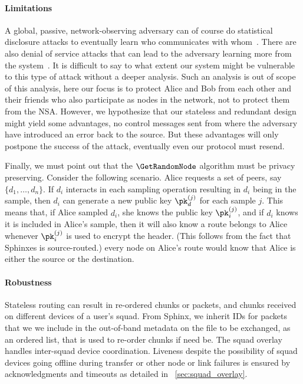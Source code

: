 \paragraph*{Limitations}%
\label{security-limitations}

A global, passive, network-observing adversary can of course do statistical 
disclosure attacks to eventually learn who communicates with 
whom~\cite{StatisticalDisclosureAttacks}.
There are also denial of service attacks that can lead to the adversary 
learning more from the system~\cite{DenialOfSecurity}.
It is difficult to say to what extent our system might be vulnerable to this 
type of attack without a deeper analysis.
Such an analysis is out of scope of this analysis, here our focus is to protect 
Alice and Bob from each other and their friends who also participate as nodes 
in the network, not to protect them from \eg the \ac{NSA}.
However, we hypothesize that our stateless and redundant design might yield 
some advantages, \eg no control messages sent from where the adversary have 
introduced an error back to the source.
But these advantages will only postpone the success of the attack, eventually 
even our protocol must resend.

Finally, we must point out that the \(\GetRandomNode\) algorithm must be 
privacy preserving.
Consider the following scenario.
Alice requests a set of peers, say \(\{d_1, \dotsc, d_n\}\).
If \(d_i\) interacts in each sampling operation resulting in \(d_i\) being in 
the sample, then \(d_i\) can generate a new public key \(\pk_d^{(j)}\) for each 
sample \(j\).
This means that, if Alice sampled \(d_i\), she knows the public key 
\(\pk_i^{(j)}\), and if \(d_i\) knows it is included in Alice's sample, then it 
will also know a route belongs to Alice whenever \(\pk_i^{(j)}\) is used to 
encrypt the header.
(This follows from the fact that Sphinxes is source-routed.)
\Ie every node on Alice's route would know that Alice is either the source or 
the destination.

\paragraph*{Robustness}

Stateless routing can result in re-ordered chunks or packets, and
chunks received on different devices of a user's squad. From
Sphinx, we inherit IDs for packets that we we include in the
out-of-band metadata on the file to be exchanged, as an ordered list,
that is used to re-order chunks if need be. The squad overlay handles
inter-squad device coordination. Liveness despite the possibility of squad devices going offline during
transfer or other node or link failures is ensured by acknowledgments
and timeouts as detailed in ~\cref{sec:squad_overlay}.




